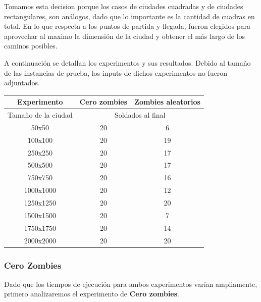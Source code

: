 Tomamos esta decision porque los casos de ciudades cuadradas y de ciudades rectangulares, son análogos, dado que lo importante es la cantidad de cuadras en total. En lo que respecta a los puntos de partida y llegada, fueron elegidos para aprovechar al maximo la dimensi\'on de la ciudad y obtener el más largo de los caminos posibles.\\

\newpage

A continuación se detallan los experimentos y sus resultados.
Debido al tamaño de las instancias de prueba, los inputs de dichos experimentos no fueron adjuntados.
\begin{center}
	\begin{tabular}{|c|c|c|}
	\hline
	Experimento & \textbf{Cero zombies} & \textbf{Zombies aleatorios}\\
	\hline
	\hline
	Tamaño de la ciudad & \multicolumn{2}{|c|}{Soldados al final}\\
	\hline
	50x50 & 20 & 6\\
	\hline
	100x100 & 20 & 19\\
	\hline
	250x250 & 20 & 17\\
	\hline
	500x500 & 20 & 17\\
	\hline
	750x750 & 20 & 16\\
	\hline
	1000x1000 & 20 & 12\\
	\hline
	1250x1250 & 20 & 20\\
	\hline
	1500x1500 & 20 & 7\\
	\hline
	1750x1750 & 20 & 14\\
	\hline
	2000x2000 & 20 & 20\\
	\hline
	\end{tabular}
\end{center}



\subsubsection*{Cero Zombies}

Dado que los tiempos de ejecución para ambos experimentos varían ampliamente, primero analizaremos el experimento de \textbf{Cero zombies}.

